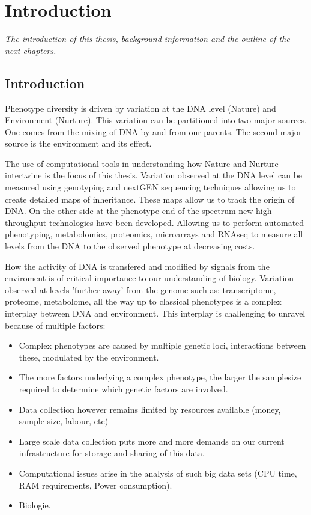 \chapter{Introduction}
\emph{The introduction of this thesis, background information and the outline of the next chapters.}

\null
\vfill
\newpage

\section{Introduction}

Phenotype diversity is driven by variation at the DNA level (Nature) and Environment (Nurture). 
This variation can be partitioned into two major sources. One comes from the mixing of DNA by 
and from our parents. The second major source is the environment and its effect.

The use of computational tools in understanding how Nature and Nurture intertwine is the 
focus of this thesis. Variation observed at the DNA level can be measured using genotyping 
and nextGEN sequencing techniques allowing us to create detailed maps of inheritance. These 
maps allow us to track the origin of DNA. On the other side at the phenotype end of the spectrum 
new high throughput technologies have been developed. Allowing us to perform automated 
phenotyping, metabolomics, proteomics, microarrays and RNAseq to measure all levels from the 
DNA to the observed phenotype at decreasing costs.

How the activity of DNA is transfered and modified by signals from the enviroment is of 
critical importance to our understanding of biology. Variation observed at levels 
'further away' from the genome such as: transcriptome, proteome, metabolome, all the way 
up to classical phenotypes is a complex interplay between DNA and environment. This 
interplay is challenging to unravel because of multiple factors:\\
\begin{itemize}
\item Complex phenotypes are caused by multiple genetic loci, interactions between these, 
modulated by the environment.
\item The more factors underlying a complex phenotype, the larger the samplesize required 
to determine which genetic factors are involved.
\item Data collection however remains limited by resources available (money, sample size, labour, etc)
\item Large scale data collection puts more and more demands on our current infrastructure for 
storage and sharing of this data.
\item Computational issues arise in the analysis of such big data sets (CPU time, RAM requirements, 
Power consumption).
\item Biologie.
\end{itemize}

